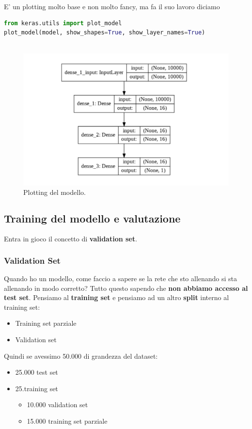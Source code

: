E' un plotting molto base e non molto fancy, ma fa il suo lavoro diciamo
\begin{lstlisting}[language=Python]
from keras.utils import plot_model
plot_model(model, show_shapes=True, show_layer_names=True)
    
\end{lstlisting}

\begin{figure}[H]
    \centering
    \includegraphics[width=0.8\linewidth]{images/plot res.png}
    \caption{Plotting del modello.}
    \label{fig:plot_model}
\end{figure}

\subsection{Training del modello e valutazione}

Entra in gioco il concetto di \textbf{validation set}.

\subsubsection{Validation Set}
Quando ho un modello, come faccio a sapere se la rete che sto allenando si sta
allenando in modo corretto? Tutto questo sapendo che \textbf{non abbiamo
    accesso al test set}. Pensiamo al \textbf{training set} e pensiamo ad un altro
\textbf{split} interno al training set:
\begin{itemize}
    \item Training set parziale
    \item Validation set
\end{itemize}

Quindi se avessimo 50.000 di grandezza del dataset:
\begin{itemize}
    \item 25.000 test set
    \item 25.training set
          \begin{itemize}
              \item 10.000 validation set
              \item 15.000 training set parziale
          \end{itemize}
\end{itemize}

